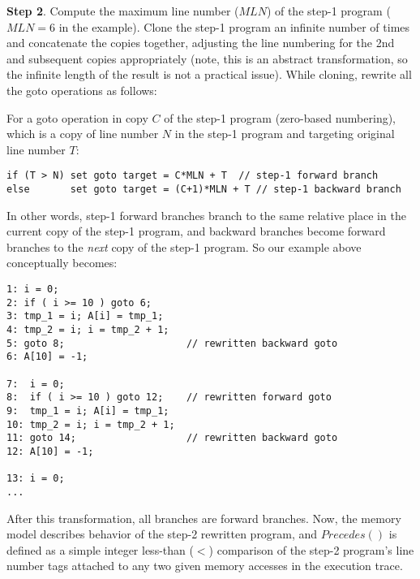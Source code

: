 \textbf{Step 2}. Compute the maximum line number ($MLN$) of the step-1 program
($MLN=6$ in the example). Clone the step-1 program an infinite number of times
and concatenate the copies together, adjusting the line numbering for the 2nd
and subsequent copies appropriately (note, this is an abstract transformation,
so the infinite length of the result is not a practical issue). While cloning,
rewrite all the goto operations as follows: 

For a goto operation in copy $C$ of the step-1 program (zero-based numbering),
which is a copy of line number $N$ in the step-1 program and targeting
original line number $T$: 
\begin{verbatim}
if (T > N) set goto target = C*MLN + T  // step-1 forward branch 
else       set goto target = (C+1)*MLN + T // step-1 backward branch 
\end{verbatim}
In other words, step-1 forward branches branch to the same relative place in
the current copy of the step-1 program, and backward branches become forward
branches to the \emph{next} copy of the step-1 program.  So our example above
conceptually becomes:
\begin{verbatim}
1: i = 0;
2: if ( i >= 10 ) goto 6;
3: tmp_1 = i; A[i] = tmp_1;
4: tmp_2 = i; i = tmp_2 + 1;
5: goto 8;                     // rewritten backward goto 
6: A[10] = -1;

7:  i = 0;
8:  if ( i >= 10 ) goto 12;    // rewritten forward goto 
9:  tmp_1 = i; A[i] = tmp_1;
10: tmp_2 = i; i = tmp_2 + 1;
11: goto 14;                   // rewritten backward goto 
12: A[10] = -1;

13: i = 0;
...
\end{verbatim}

After this transformation, all branches are forward branches. Now, the memory
model describes behavior of the step-2 rewritten program, and $Precedes()$ is
defined as a simple integer less-than ($<$) comparison of the step-2 program's
line number tags attached to any two given memory accesses in the execution
trace.

